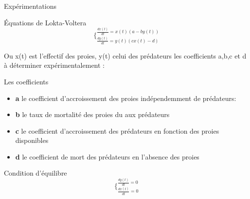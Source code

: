 \documentclass{beamer}
\begin{document}
\begin{frame}{Expérimentations}
    \begin{block}{Équations de Lokta-Voltera}
        \begin{equation}
             \lbrace_{\frac{dy(t)}{dt}  =  y(t)(cx(t) - d)} ^{\frac{dx(t)}{dt} = x(t)(a - by(t))}
        \end{equation}
    \end{block}
    
    Ou x(t) est l'effectif des proies, y(t) celui des prédateurs les coefficients a,b,c et d à déterminer expérimentalement :
    \begin{alertblock}{Les coefficients}
    
	\begin{itemize}
        \item \textbf{a} le coefficient d'accroissement des proies indépendemment de prédateurs:
        \item \textbf{b} le taux de mortalité des proies du aux prédateurs
        \item \textbf{c} le coefficient d'accroissement des prédateurs en fonction des proies disponibles
        \item \textbf{d} le coefficient de mort des prédateurs en l'absence des proies
	\end{itemize}
\end{alertblock}
\end{frame}

\begin{frame}
    \begin{block}{Condition d'équilibre}
        \begin{equation}
            \lbrace_{\frac{dx(t)}{dt} = 0}^{\frac{dy(t)}{dt} = 0}
        \end{equation}
    \end{block}

\end{frame}
\end{document}
